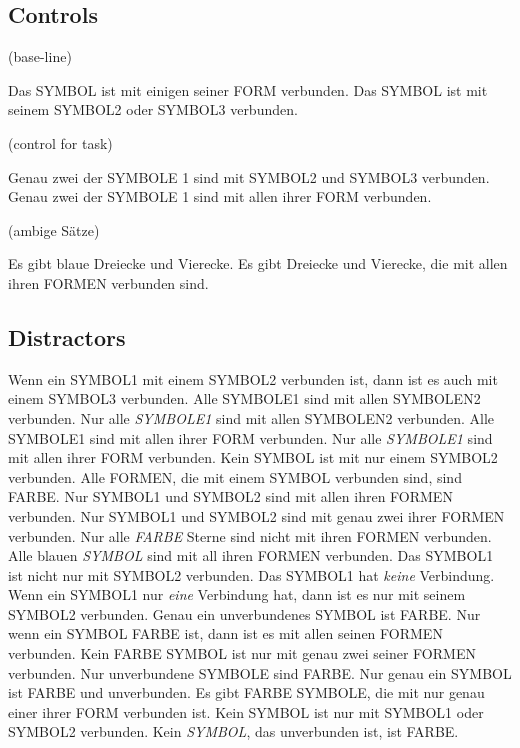 \documentclass[fleqn,reqno,10pt]{article}
\begin{document}
\subsection{Controls}

\begin{exe}
\ex (base-line)
  \begin{xlist}
  \ex Das SYMBOL ist mit einigen seiner FORM verbunden.
  \ex Das SYMBOL ist mit seinem SYMBOL2 oder SYMBOL3 verbunden.
  \end{xlist}
\ex (control for task)
  \begin{xlist}
  \ex Genau zwei der SYMBOLE 1 sind mit SYMBOL2 und SYMBOL3 verbunden.
  \ex Genau zwei der SYMBOLE 1 sind mit allen ihrer FORM verbunden.
  \end{xlist}
\ex (ambige Sätze)
  \begin{xlist}
    \ex Es gibt blaue Dreiecke und Vierecke.
    \ex Es gibt Dreiecke und Vierecke, die mit allen ihren FORMEN
      verbunden sind.
  \end{xlist}
\end{exe}




\subsection{Distractors}

\begin{exe}
  \ex
    \begin{xlist}
    \ex Wenn ein SYMBOL1 mit einem SYMBOL2 verbunden ist, dann ist
      es auch mit einem SYMBOL3 verbunden.
    \ex Alle SYMBOLE1 sind mit allen SYMBOLEN2 verbunden.
    \ex Nur alle \emph{SYMBOLE1} sind mit allen SYMBOLEN2 verbunden.
    \ex Alle SYMBOLE1 sind mit allen ihrer FORM verbunden.
    \ex Nur alle \emph{SYMBOLE1} sind mit allen ihrer FORM verbunden.
    \ex Kein SYMBOL ist mit nur einem SYMBOL2 verbunden.
    \ex Alle FORMEN, die mit einem SYMBOL verbunden sind, sind FARBE.
    \ex Nur SYMBOL1 und SYMBOL2 sind mit allen ihren FORMEN
      verbunden.
    \ex Nur SYMBOL1 und SYMBOL2 sind mit genau zwei ihrer FORMEN
      verbunden.
    \ex Nur alle \emph{FARBE} Sterne sind nicht mit ihren FORMEN
      verbunden.
    \ex Alle blauen \emph{SYMBOL} sind mit all ihren FORMEN
      verbunden.
    \ex Das SYMBOL1 ist nicht nur mit SYMBOL2 verbunden.
    \ex Das SYMBOL1 hat \emph{keine} Verbindung.
    \ex Wenn ein SYMBOL1 nur \emph{eine} Verbindung hat, dann ist es
      nur mit seinem SYMBOL2 verbunden.
    \ex Genau ein unverbundenes SYMBOL ist FARBE.
    \ex Nur wenn ein SYMBOL FARBE ist, dann ist es mit allen seinen
      FORMEN verbunden.
    \ex Kein FARBE SYMBOL ist nur mit genau zwei seiner FORMEN
      verbunden.
    \ex Nur unverbundene SYMBOLE sind FARBE.
    \ex Nur genau ein SYMBOL ist FARBE und unverbunden.
    \ex Es gibt FARBE SYMBOLE, die mit nur genau einer ihrer FORM
      verbunden ist.
    \ex Kein SYMBOL ist nur mit SYMBOL1 oder SYMBOL2 verbunden.
    \ex Kein \emph{SYMBOL}, das unverbunden ist, ist FARBE.
    \end{xlist}
\end{exe}
\end{document}
